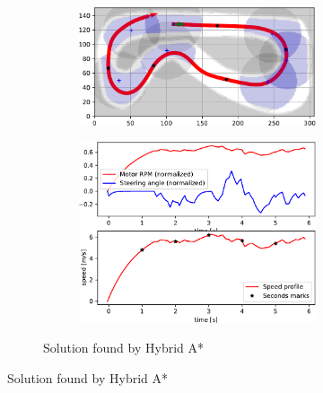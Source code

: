 \begin{figure}[!tbp]%
	\centering

	\begin{subfigure}[t]{\textwidth}
		\begin{subfigure}[t]{0.45\textwidth}
			\includegraphics[width=\textwidth]{../img/experiments/porto-hybrid_astar-trajectory}
		\end{subfigure}
		\hfill
		\begin{subfigure}[t]{0.45\textwidth}
			\includegraphics[width=\textwidth]{../img/experiments/porto-hybrid_astar-actuators}
		\end{subfigure}
		\caption{Solution found by Hybrid A*}
		\label{fig:solution_porto-hybrid_astar}	
	\end{subfigure}
	
	\vspace{0.75cm}
	

\end{figure}
